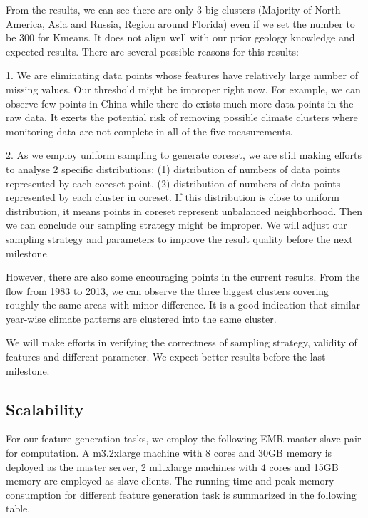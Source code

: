 From the results, we can see there are only 3 big clusters (Majority of North America, Asia and Russia, Region around Florida) even if we set the number to be 300 for Kmeans. It does not align well with our prior geology knowledge and expected results. There are several possible reasons for this results:

1. We are eliminating data points whose features have relatively large number of missing values. Our threshold might be improper right now. For example, we can observe few points in China while there do exists much more data points in the raw data. It exerts the potential risk of removing possible climate clusters where monitoring data are not complete in all of the five measurements.

2. As we employ uniform sampling to generate coreset, we are still making efforts to analyse 2 specific distributions: (1) distribution of  numbers of data points represented by each coreset point. (2) distribution of numbers of data points represented by each cluster in coreset. If this distribution is close to uniform distribution, it means points in coreset represent unbalanced neighborhood. Then we can conclude our sampling strategy might be improper. We will adjust our sampling strategy and parameters to improve the result quality before the next milestone.

However, there are also some encouraging points in the current results. From the flow from 1983 to 2013, we can observe the three biggest clusters covering roughly the same areas with minor difference. It is a good indication that similar year-wise climate patterns are clustered into the same cluster. 

We will make efforts in verifying the correctness of sampling strategy, validity of features and different parameter. We expect better results before the last milestone. 

\subsection{Scalability}
For our feature generation tasks, we employ the following EMR master-slave pair for computation. A m3.2xlarge machine with 8 cores and 30GB memory is deployed as the master server, 2 m1.xlarge machines with 4 cores and	15GB memory are employed as slave clients. The running time and peak memory consumption for different feature generation task is summarized in the following table.

